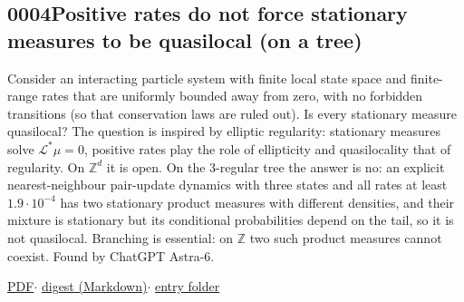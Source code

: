 \documentclass[11pt]{article}
\newcommand{\Z}{\mathbb{Z}}
\newcommand{\repo}{https://github.com/jonaskoeppl/counterexamples-ips}
\newcommand{\entrylinks}[1]{\par\smallskip\noindent\small
  \href{\repo/blob/main/pdf/#1.pdf}{PDF}\enspace$\cdot$\enspace
  \href{\repo/blob/main/entries/#1/digest.md}{digest (Markdown)}\enspace$\cdot$\enspace
  \href{\repo/tree/main/entries/#1}{entry folder}\normalsize}
\newcommand{\entry}[3]{\subsection*{#1\quad #2}\noindent{\small Status: \emph{#3}}\par\smallskip\noindent\ignorespaces}
\begin{document}
\entry{0004}{Positive rates do not force stationary measures to be quasilocal (on a tree)}{plausible}
Consider an interacting particle system with finite local state space and finite-range rates that are uniformly bounded away from zero, with no forbidden transitions (so that conservation laws are ruled out). Is every stationary measure quasilocal? The question is inspired by elliptic regularity: stationary measures solve $\mathscr L^*\mu=0$, positive rates play the role of ellipticity and quasilocality that of regularity. On $\Z^d$ it is open. On the $3$-regular tree the answer is no: an explicit nearest-neighbour pair-update dynamics with three states and all rates at least $1.9\cdot10^{-4}$ has two stationary product measures with different densities, and their mixture is stationary but its conditional probabilities depend on the tail, so it is not quasilocal. Branching is essential: on $\Z$ two such product measures cannot coexist. Found by ChatGPT Astra-6.
\entrylinks{0004-positive-rates-nonquasilocal-tree}
\end{document}

